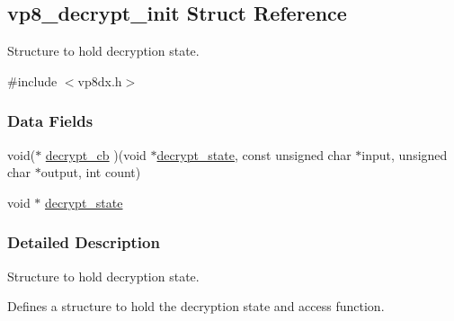 \hypertarget{structvp8__decrypt__init}{\subsection{vp8\-\_\-decrypt\-\_\-init \-Struct \-Reference}
\label{structvp8__decrypt__init}
}


\-Structure to hold decryption state.  




{\ttfamily \#include $<$vp8dx.\-h$>$}

\subsubsection*{\-Data \-Fields}
\begin{DoxyCompactItemize}
\item 
void($\ast$ \hyperlink{structvp8__decrypt__init_ae8eaa106b6567813006a0afb5a46a36c}{decrypt\-\_\-cb} )(void $\ast$\hyperlink{structvp8__decrypt__init_a1bb41a1fbd95eaccc79a322dc4c6685d}{decrypt\-\_\-state}, const unsigned char $\ast$input, unsigned char $\ast$output, int count)
\item 
void $\ast$ \hyperlink{structvp8__decrypt__init_a1bb41a1fbd95eaccc79a322dc4c6685d}{decrypt\-\_\-state}
\end{DoxyCompactItemize}


\subsubsection{\-Detailed \-Description}
\-Structure to hold decryption state. 

\-Defines a structure to hold the decryption state and access function. 

